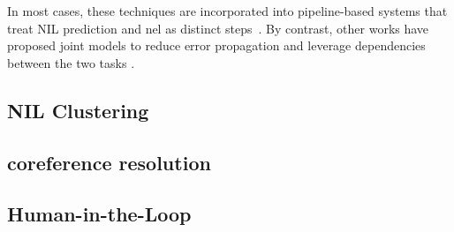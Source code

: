
In most cases, these techniques are incorporated into pipeline-based systems that treat NIL prediction and \ac{nel} as distinct steps~\cite{}. By contrast, other works have proposed joint models to reduce error propagation and leverage dependencies between the two tasks \cite{fahrni2013hits,martins-etal-2019-joint}.



\subsection{NIL Clustering}
\subsection{coreference resolution}
\subsection{Human-in-the-Loop}
